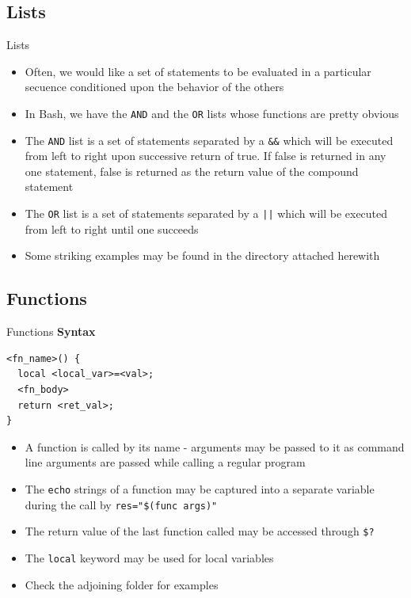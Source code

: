 \documentclass{beamer}
\begin{document}
\subsection{Lists}
\begin{frame}[fragile]{Lists}
  \begin{itemize}
  \item Often, we would like a set of statements to be evaluated in a
    particular secuence conditioned upon the behavior of the others
  \item In Bash, we have the \verb|AND| and the \verb|OR| lists whose
    functions are pretty obvious
  \item The \verb|AND| list is a set of statements separated by a
    \verb|&&| which will be executed from left to right upon
    successive return of true. If false is returned in any one
    statement, false is returned as the return value of the compound
    statement
  \item The \verb|OR| list is a set of statements separated by a
    \verb+||+ which will be executed from left to right until one
    succeeds
  \item Some striking examples may be found in the directory attached
    herewith 
  \end{itemize}
\end{frame}

\subsection{Functions}
\begin{frame}[fragile]{Functions}
    \textbf{Syntax}\\
\begin{verbatim}
<fn_name>() {
  local <local_var>=<val>;
  <fn_body>
  return <ret_val>;
}
\end{verbatim}
  \begin{itemize}
  \item A function is called by its name - arguments may be passed to
    it as command line arguments are passed while calling a regular
    program
  \item The \verb|echo| strings of a function may be captured into a
    separate variable during the call by \verb|res="$(func args)"|
  \item The return value of the last function called may be accessed
    through \verb|$?|
  \item The \verb|local| keyword may be used for local variables
  \item Check the adjoining folder for examples
  \end{itemize}
\end{frame}
\end{document}
